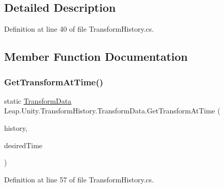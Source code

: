 \subsection{Detailed Description}


Definition at line 40 of file Transform\+History.\+cs.



\subsection{Member Function Documentation}
\mbox{\label{struct_leap_1_1_unity_1_1_transform_history_1_1_transform_data_add53e4e63a0215262a28e9bea8a501cf}} 
\subsubsection{\texorpdfstring{GetTransformAtTime()}{GetTransformAtTime()}}
{\footnotesize\ttfamily static \mbox{\hyperlink{struct_leap_1_1_unity_1_1_transform_history_1_1_transform_data}{Transform\+Data}} Leap.\+Unity.\+Transform\+History.\+Transform\+Data.\+Get\+Transform\+At\+Time (\begin{DoxyParamCaption}\item[{\mbox{\hyperlink{class_leap_1_1_unity_1_1_ring_buffer}{Ring\+Buffer}}$<$ \mbox{\hyperlink{struct_leap_1_1_unity_1_1_transform_history_1_1_transform_data}{Transform\+Data}} $>$}]{history,  }\item[{long}]{desired\+Time }\end{DoxyParamCaption})\hspace{0.3cm}{\ttfamily [static]}}



Definition at line 57 of file Transform\+History.\+cs.

\mbox{\label{struct_leap_1_1_unity_1_1_transform_history_1_1_transform_data_adb76fa1aeb96a2febd96463d984fbeb1}} 
